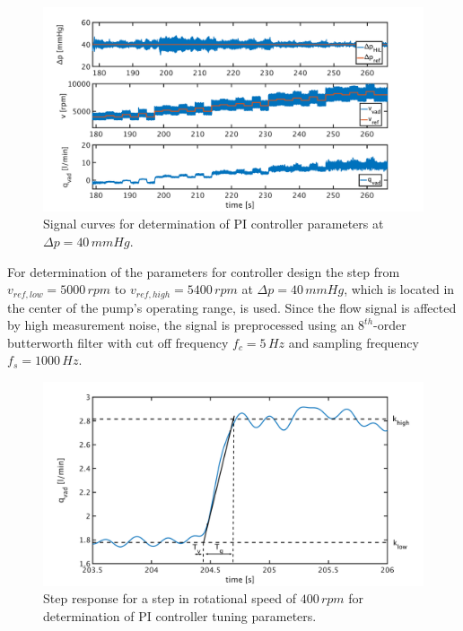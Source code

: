 \begin{figure}[ht]
  \centering
  \includegraphics[width=\textwidth]{images/chapt_5/dyn_meas_40.pdf}
  \caption[Signal curves for determination of PI controller parameters at $\Delta{p}=40\,mmHg$]{Signal curves for determination of PI controller parameters at $\Delta{p}=40\,mmHg$.}
  \label{fig:dyn_meas_40}
\end{figure}
For determination of the parameters for controller design the step from $v_{ref,low}=5000\, rpm$ to $v_{ref,high}=5400\, rpm$ at $\Delta{p}=40\,mmHg$, which is located in the center of the pump's operating range, is used.
Since the flow signal is affected by high measurement noise, the signal is preprocessed using an $8^{th}$-order butterworth filter with cut off frequency $f_c=5\,Hz$ and sampling frequency $f_s=1000\,Hz$.
\begin{figure}[ht]
  \centering
  \includegraphics[width=\textwidth]{images/chapt_5/param_calc_PI.pdf}
  \caption[Step response for determination of PI controller tuning parameters]{Step response for a step in rotational speed of $400\,rpm$ for determination of PI controller tuning parameters.}
  \label{fig:param_calc_PI}
\end{figure}
